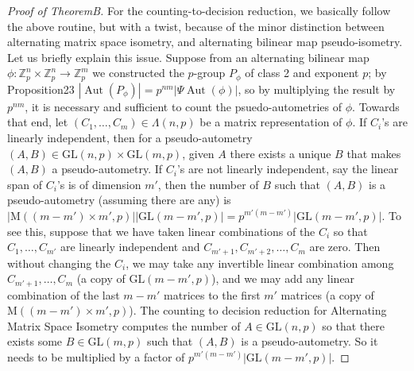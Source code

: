 \begin{proof}[Proof of TheoremB]
For the counting-to-decision reduction, we basically follow the above routine, but with a twist, because of the minor distinction between alternating matrix space isometry, and alternating bilinear map pseudo-isometry. Let us briefly explain this issue. Suppose from an alternating bilinear map $\phi:\mathbb Z_p^n\times\mathbb Z_p^n\to\mathbb Z_p^m$ we constructed the $p$-group $P_\phi$ of class 2 and exponent $p$; by Proposition23 $|\operatorname{Aut}(P_\phi)|=p^{nm}|\Psi\operatorname{Aut}(\phi)|$, so by multiplying the result by $p^{nm}$, it is necessary and sufficient to count the psuedo-autometries of $\phi$.
Towards that end, let $(C_1,\ldots,C_m)\in\Lambda(n,p)$ be a matrix representation of $\phi$. If $C_i$'s are linearly independent, then for a pseudo-autometry $(A,B)\in\mathrm{GL}(n,p)\times\mathrm{GL}(m,p)$, given $A$ there exists a unique $B$ that makes $(A,B)$ a pseudo-autometry. If $C_i$'s are not linearly independent, say the linear span of $C_i$'s is of dimension $m'$, then the number of $B$ such that $(A,B)$ is a pseudo-autometry (assuming there are any) is $|\mathrm M((m-m')\times m',p)||\mathrm{GL}(m-m',p)|=p^{m'(m-m')}|\mathrm{GL}(m-m',p)|$. To see this, suppose that we have taken linear combinations of the $C_i$ so that $C_1,\ldots,C_{m'}$ are linearly independent and $C_{m'+1},C_{m'+2},\ldots,C_m$ are zero. Then without changing the $C_i$, we may take any invertible linear combination among $C_{m'+1},\ldots,C_m$ (a copy of $\mathrm{GL}(m-m',p)$), and we may add any linear combination of the last $m-m'$ matrices to the first $m'$ matrices (a copy of $\mathrm M((m-m')\times m',p)$). The counting to decision reduction for Alternating Matrix Space Isometry computes the number of $A\in\mathrm{GL}(n,p)$ so that there exists some $B\in\mathrm{GL}(m,p)$ such that $(A,B)$ is a pseudo-autometry. So it needs to be multiplied by a factor of $p^{m'(m-m')}|\mathrm{GL}(m-m',p)|$.
\end{proof}
